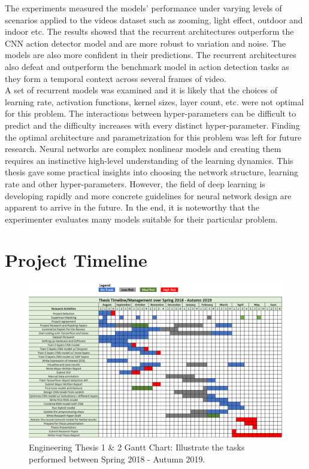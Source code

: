 The experiments measured the models’ performance under varying levels of scenarios applied to the videos dataset such as zooming, light effect, outdoor and indoor etc. The results showed that the recurrent architectures outperform the CNN action detector model and are more robust to variation and noise. The models are also more confident in their predictions. The recurrent architectures also defeat and outperform the benchmark model in action detection tasks as they form a temporal context across several frames of video.\\

A set of recurrent models was examined and it is likely that the choices of learning rate, activation functions, kernel sizes, layer count, etc. were not optimal for this problem. The interactions between hyper-parameters can be difficult to predict and the difficulty increases with every distinct hyper-parameter. Finding the optimal architecture and parametrization for this problem was left for future research. Neural networks are complex nonlinear models and creating them requires an instinctive high-level understanding of the learning dynamics. This thesis gave some practical insights into choosing the network structure, learning rate and other hyper-parameters. However, the field of deep learning is developing rapidly and more concrete guidelines for neural network design are apparent to arrive in the future. In the end, it is noteworthy that the experimenter evaluates many models suitable for their particular problem.\\




\chapter{Project Timeline}

\begin{figure}[ht]
\centering

\includegraphics[angle=90,origin=c,width=0.7\columnwidth]{Figures/Project_Timeline.PNG}
\decoRule
\caption[Engineering Thesis 1 \& 2 Gantt Chart: Illustrate the tasks performed between Spring 2018 - Autumn 2019.]{Engineering Thesis 1 \& 2 Gantt Chart: Illustrate the tasks performed between Spring 2018 - Autumn 2019.}
\label{fig:missclassified1}
\end{figure}

